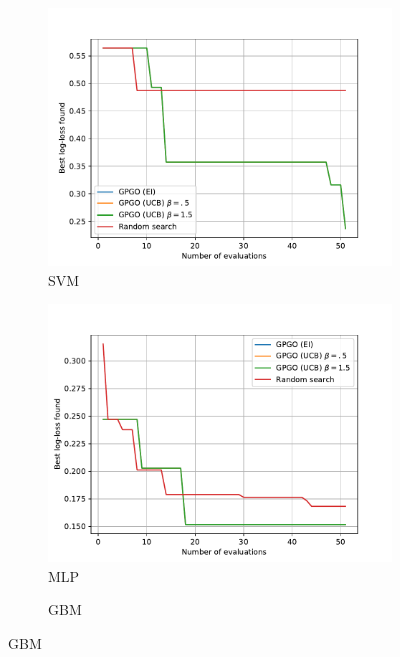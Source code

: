 \documentclass[10pt,a4paper,twoside]{book}
\begin{document}
\begin{figure}[ht]
  \centering
  \caption{Benchmarking results for the Parkinson's disease dataset.}
  \begin{subfigure}[t]{0.5\textwidth}
  	\caption{SVM}
    \centering\includegraphics[width=\textwidth]{figures/chapter4/parkinson/svm}
  \end{subfigure}
    \begin{subfigure}[t]{0.5\textwidth}
    \caption{MLP}
    \centering\includegraphics[width=\textwidth]{figures/chapter4/parkinson/mlp}
  \end{subfigure}%
    \begin{subfigure}[t]{0.5\textwidth}
    \caption{GBM}

\end{subfigure}
\end{figure}
\end{document}
